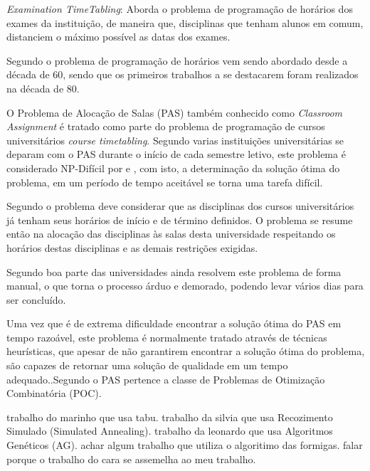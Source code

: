 \textit{Examination TimeTabling}: Aborda o problema de programação de horários dos exames da instituição, de maneira que, disciplinas que tenham alunos em comum, distanciem o máximo possível as datas dos exames.\par

Segundo \cite{pinheiro2001ambiente} o problema de programação de horários vem sendo abordado desde a década de 60, sendo que os primeiros trabalhos a se destacarem foram realizados na década de 80.\par

O Problema de Alocação de Salas (PAS) também conhecido como \textit{Classroom Assignment} é tratado como parte do problema de programação de cursos universitários \textit{course timetabling}. Segundo \cite{marinho2005heuristicas} varias instituições universitárias se deparam com o PAS durante o início de cada semestre letivo, este problema é considerado NP-Difícil por \cite{even1975complexity} e \cite{carter1992classroom}, com isto, a determinação da solução ótima do problema, em um período de tempo aceitável se torna uma tarefa difícil.\par
Segundo \cite{kripkasimulated} o problema deve considerar que as disciplinas dos cursos universitários já tenham seus horários de início e de término definidos. O problema se resume então na alocação das disciplinas às salas desta universidade respeitando os horários destas disciplinas e as demais restrições exigidas.

Segundo \cite{souza2000} boa parte das universidades ainda resolvem este problema de forma manual, o que torna o processo árduo e demorado, podendo levar vários dias para ser concluído.\par

Uma vez que é de extrema dificuldade encontrar a solução ótima do PAS em tempo razoável, este problema é normalmente tratado através de técnicas heurísticas, que apesar de não garantirem encontrar a solução ótima do problema, são capazes de retornar uma solução de qualidade em um tempo adequado.\cite{nascimento2005aplicaccao}.Segundo \cite{even1975complexity} o PAS pertence a classe de Problemas de Otimização Combinatória (POC).\par


trabalho do marinho que usa tabu.
trabalho da silvia que usa Recozimento Simulado (Simulated Annealing).
trabalho da leonardo que usa Algoritmos Genéticos (AG).
achar algum trabalho que utiliza o algoritimo das formigas.
falar porque o trabalho do cara se assemelha ao meu trabalho.